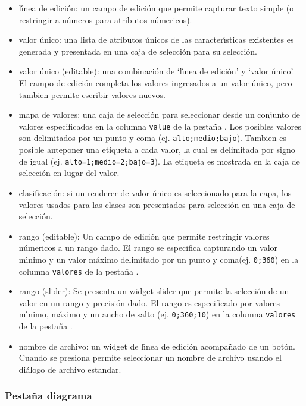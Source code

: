 \begin{itemize}
\item l\'{\i}nea de edici\'on: un campo de edici\'on que permite capturar texto simple (o restringir a 
n\'umeros para atributos n\'umericos).
\item valor \'unico: una lista de atributos \'unicos de las caracter\'{\i}sticas existentes
es generada y presentada en una caja de selecci\'on para su selecci\'on.
\item  valor  \'unico (editable): una combinaci\'on de `l\'{\i}nea de edici\'on' y `valor \'unico'.
El campo de edici\'on completa los valores ingresados a un valor \'unico, pero tambien permite
escribir valores nuevos.
\item mapa de valores: una caja de selecci\'on para seleccionar desde un conjunto de valores especificados en la
columna \texttt{value} de la pesta\~na .  Los posibles valores son 
delimitados por un punto y coma (ej. \verb|alto;medio;bajo|). Tambien es posible
anteponer una etiqueta a cada valor, la cual es delimitada por signo de igual (ej.
\verb|alto=1;medio=2;bajo=3|). La etiqueta es mostrada en la caja de selecci\'on en lugar
del valor.
\item clasificaci\'on: si un renderer de valor \'unico es seleccionado para la capa, los valores
usados para las clases son presentados para selecci\'on en una caja de selecci\'on.
\item rango (editable): Un campo de edici\'on que permite restringir valores n\'umericos a un
rango dado.  El rango se especifica capturando un valor m\'{\i}nimo y un valor m\'aximo
delimitado por un punto y coma(ej. \verb|0;360|) en la columna \texttt{valores} de
la pesta\~na .
\item rango (slider): Se presenta un widget slider que permite la selecci\'on de un valor
en un rango y precisi\'on dado.  El rango es especificado por valores m\'{\i}nimo, m\'aximo
y un ancho de salto (ej. \verb|0;360;10|) en la columna \texttt{valores} de
la pesta\~na .
\item nombre de archivo: un widget de l\'{\i}nea de edici\'on acompa\~nado de un bot\'on. Cuando se
presiona permite seleccionar un nombre de archivo usando el di\'alogo de archivo estandar.
\end{itemize}

\subsubsection{Pesta\~na diagrama}\label{sec:diagram}

